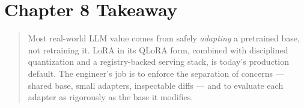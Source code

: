 \section{Chapter 8 Takeaway}

\begin{quote}
Most real-world LLM value comes from safely \emph{adapting} a
pretrained base, not retraining it. LoRA in its QLoRA form, combined
with disciplined quantization and a registry-backed serving stack, is
today's production default. The engineer's job is to enforce the
separation of concerns --- shared base, small adapters, inspectable
diffs --- and to evaluate each adapter as rigorously as the base it
modifies.
\end{quote}
